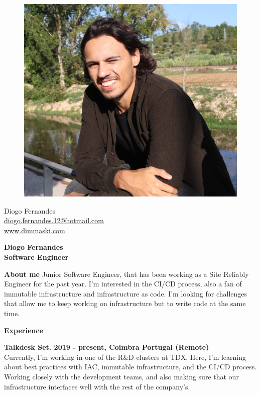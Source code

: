 \documentclass[a4paper,12pt,final]{memoir}
\newcommand{\Sep}{\vspace{1.5em}}
\newcommand{\SmallSep}{\vspace{0.5em}}
\newenvironment{AboutMe}
	{\ignorespaces\textbf{\color{RoyalBlue} About me}}
	{\Sep\ignorespacesafterend}
\newcommand{\CVSection}[1]
	{\Large\textbf{#1}\par
	\SmallSep\normalsize\normalfont}
\newcommand{\CVItem}[1]
	{\textbf{\color{RoyalBlue} #1}}
\begin{document}
%
\begin{figure}
	\hfill
	\includegraphics[width=0.6\columnwidth]{cv-photo.jpg}
	\vspace{-7cm}
\end{figure}

\begin{flushright}\small
	Diogo Fernandes \\
	\url{diogo.fernandes.12@hotmail.com}  \\
	\url{www.dimmaski.com} \\
\end{flushright}\normalsize
\framebreak


\Huge\bfseries {\color{RoyalBlue} Diogo Fernandes} \\
\Large\bfseries  Software Engineer \\

\normalsize\normalfont

\begin{AboutMe}
Junior Software Engineer, that has been working as a Site Reliably Engineer for the past year. I'm interested in the CI/CD process, also a fan of immutable infrastructure and infrastructure as code. I'm looking for challenges that allow me to keep working on infrastructure but to write code at the same time.
\end{AboutMe}

\CVSection{Experience}
\CVItem{Talkdesk Set. 2019 - present, Coimbra Portugal (Remote)}\\
Currently, I'm working in one of the R\&D clusters at TDX. Here, I'm learning about best practices with IAC, immutable infrastructure, and the CI/CD process. Working closely with the development teams, and also making sure that our infrastructure interfaces well with the rest of the company's.
\SmallSep
\end{document}
